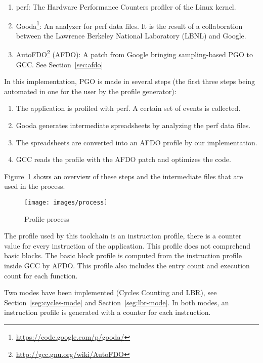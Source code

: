 \documentclass[9pt,english,twocolumn,letter]{article}
\begin{document}
\begin{enumerate}
    \item perf\cite{DeMelo2010}: The Hardware Performance Counters profiler of the Linux kernel.
    \item Gooda\footnote{\url{https://code.google.com/p/gooda/}}\cite{Calafiura2012}: An analyzer for perf data files. It is the result of a collaboration between the Lawrence Berkeley National Laboratory (LBNL) and Google. \item AutoFDO\footnote{\url{http://gcc.gnu.org/wiki/AutoFDO}} (AFDO): A patch from Google bringing sampling-based PGO to GCC. See Section~\ref{sec:afdo}
\end{enumerate}

In this implementation, PGO is made in several steps (the first three steps being automated in one for the user by the profile generator):

\begin{enumerate}
    \item The application is profiled with perf. A certain set of events is collected.
    \item Gooda generates intermediate spreadsheets by analyzing the perf data files.
    \item The spreadsheets are converted into an AFDO profile by our implementation.
    \item GCC reads the profile with the AFDO patch and optimizes the code.
\end{enumerate}

Figure~\ref{fig:machinery} shows an overview of these steps and the intermediate files that are used in the process.

\begin{figure}
    \centering
    \texttt{[image: images/process]}
    \caption{Profile process}
    \label{fig:machinery}
\end{figure}

The profile used by this toolchain is an instruction profile, there is a counter value for every instruction of the application. This profile does not comprehend basic blocks. The basic block profile is computed from the instruction profile inside GCC by AFDO. This profile also includes the entry count and execution count for each function.

Two modes have been implemented (Cycles Counting and LBR), see Section~\ref{seg:cycles-mode} and Section~\ref{seg:lbr-mode}. In both modes, an instruction profile is generated with a counter for each instruction.
\end{document}
